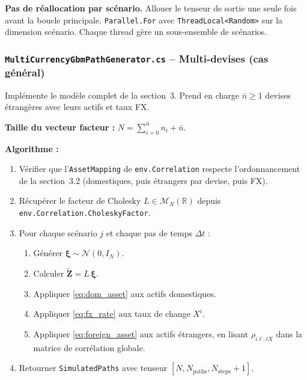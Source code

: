 \documentclass[a4paper,11pt]{article}
\newcommand{\cs}[1]{\texttt{\color{codeinline}#1}}
\begin{document}
\begin{tcolorbox}[constraint]
\textbf{Pas de r\'eallocation par sc\'enario.} Allouer le tenseur de sortie une seule
fois avant la boucle principale. \cs{Parallel.For} avec \cs{ThreadLocal<Random>}
sur la dimension sc\'enario. Chaque thread g\`ere un sous-ensemble de sc\'enarios.
\end{tcolorbox}

\subsubsection{\texttt{MultiCurrencyGbmPathGenerator.cs} -- Multi-devises (cas g\'en\'eral)}

Impl\'emente le mod\`ele complet de la section~3. Prend en charge $\bar{n} \ge 1$ devises
\'etrang\`eres avec leurs actifs et taux FX.

\textbf{Taille du vecteur facteur :} $N = \sum_{i=0}^{\bar{n}} n_i + \bar{n}$.

\textbf{Algorithme :}
\begin{enumerate}[leftmargin=1.5em]
  \item V\'erifier que l'\cs{AssetMapping} de \cs{env.Correlation} respecte l'ordonnancement
        de la section~3.2 (domestiques, puis \'etrangers par devise, puis FX).
  \item R\'ecup\'erer le facteur de Cholesky $L \in \mathcal{M}_N(\mathbb{R})$ depuis
        \cs{env.Correlation.CholeskyFactor}.
  \item Pour chaque sc\'enario $j$ et chaque pas de temps $\Delta t$ :
        \begin{enumerate}[leftmargin=1.5em]
          \item G\'en\'erer $\boldsymbol{\xi} \sim \mathcal{N}(0, I_N)$.
          \item Calculer $\widetilde{\mathbf{Z}} = L\,\boldsymbol{\xi}$.
          \item Appliquer \eqref{eq:dom_asset} aux actifs domestiques.
          \item Appliquer \eqref{eq:fx_rate} aux taux de change $X^i$.
          \item Appliquer \eqref{eq:foreign_asset} aux actifs \'etrangers, en lisant
                $\rho_{i\ell,iX}$ dans la matrice de corr\'elation globale.
        \end{enumerate}
  \item Retourner \cs{SimulatedPaths} avec tenseur $[N, N_\text{paths}, N_\text{steps}+1]$.
\end{enumerate}
\end{document}

